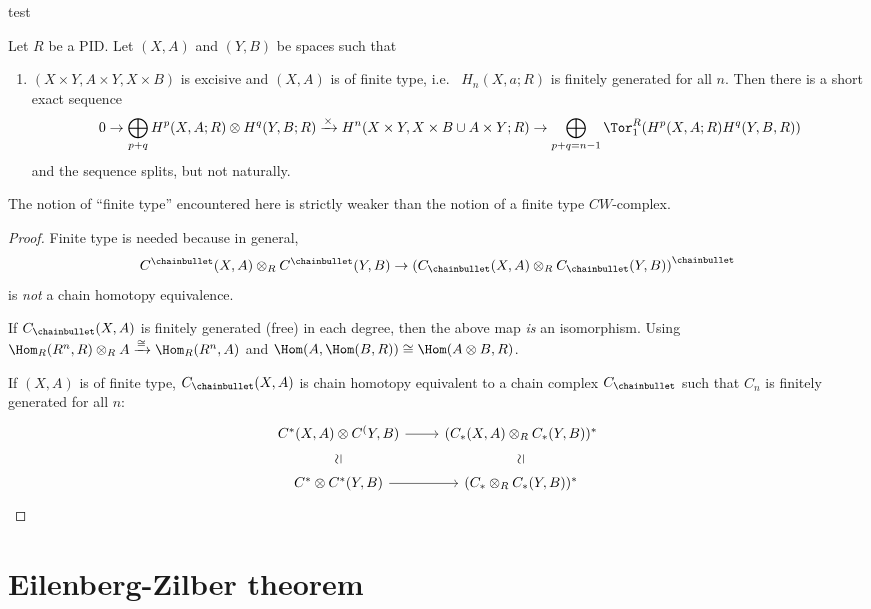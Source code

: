 
test

\begin{theorem}
  Let $R$ be a PID.
  Let  $(X,A)$ and  $(Y,B)$ be spaces such that
   \begin{enumerate}[p]
    \item
      $(X \times Y, A\times Y, X\times B)$ is excisive
      and $(X,A)$ is of finite type, i.e.~ $H_n(X,a;R)$ is finitely generated for all $n$.
      Then there is a short exact sequence
      \[
      0 \to  \bigoplus_{p+q} H^p(X,A;R) \otimes H^q(Y,B;R)
      \xrightarrow{\times } H^n(X\times Y, X\times B \cup A\times Y;R)
      \to \bigoplus_{p+q=n-1} \Tor_1^R(H^p(X,A;R) H^q(Y,B,R))
      \]
      and the sequence splits, but not naturally.
  \end{enumerate}
\end{theorem}

\begin{oral}
  The notion of \enquote{finite type} encountered here is strictly
  weaker than the notion of a finite type $CW$-complex.
\end{oral}

\begin{proof}
  Finite type is needed because in general,
  \[
  C^{\chainbullet}(X,A) \otimes _R C^{\chainbullet} (Y,B)
  \to
  \left( C_\chainbullet (X,A) \otimes _R C_\chainbullet (Y,B) \right) ^{\chainbullet}
  \]
  is \emph{not} a chain homotopy equivalence.

  If $C_\chainbullet (X,A)$ is finitely generated (free) in each degree,
  then the above map \emph{is} an isomorphism.
  Using
  $\Hom_R(R^n, R) \otimes _R A \xrightarrow{\cong}  \Hom_R(R^n,A)$
  and
  $\Hom(A, \Hom(B,R)) \cong \Hom(A \otimes B, R)$.

  If $(X,A)$ is of finite type,
   $C_\chainbullet (X,A)$ is chain homotopy equivalent
   to a chain complex
   $C_\chainbullet $ such that $C_n$ is finitely generated
   for all  $n$:
    \[
   \begin{tikzcd}
     C^*(X,A) \otimes C^(Y,B) \ar[phantom]{d}[rotate=90]{\simeq} \ar{r}{} & (C_*(X,A) \otimes _R C_*(Y,B))^* \ar[phantom]{d}[rotate=90]{\simeq} \\
     C^* \otimes C^*(Y,B) \ar[swap]{r}{} & (C_* \otimes _R C_*(Y,B))^*
   \end{tikzcd}
   \]
\end{proof}

\section{Eilenberg-Zilber theorem}


